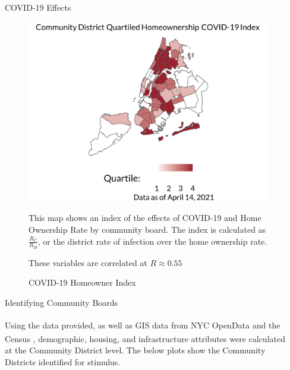\documentclass[final]{beamer}
\newlength{\sepwidth}
\newlength{\colwidth}
\newcommand{\separatorcolumn}{\begin{column}{\sepwidth}\end{column}}
\begin{document}
\begin{frame}[t]
\begin{columns}[t]
\separatorcolumn

\begin{column}{\colwidth}

  \begin{block}{COVID-19 Effects}
\begin{figure}[!tbp]
  
  \begin{multicols}{2}
  \includegraphics[width = 0.5\colwidth]{pics/covid_rate_4tile.png}
  \caption{COVID-19 Homeowner Index}
  \columnbreak
  \vfill\par
    This map shows an index of the effects of COVID-19 and Home Ownership Rate by community board. The index is calculated as $\frac{R_C}{R_H}$, or the district rate of infection over the home ownership rate.
    
    These variables are correlated at $R \approx 0.55$
  \end{multicols}
\end{figure}

\end{block}

\begin{block}{Identifying Community Boards}

    Using the data provided, as well as GIS data from NYC OpenData \textsuperscript{\cite{nyc}} and the Census \textsuperscript{\cite{census}}, demographic, housing, and infrastructure attributes were calculated at the Community District level. The below plots show the Community Districts identified for stimulus.
    


\end{block}
\end{column}
\end{columns}
\end{frame}
\end{document}

